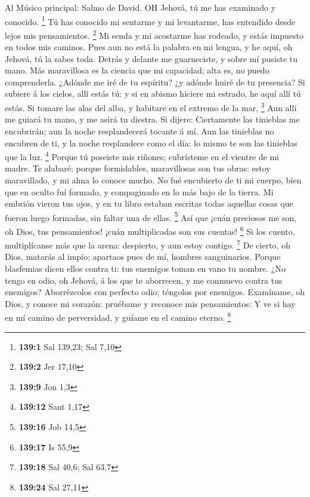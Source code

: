  Al Músico principal: Salmo de David. OH Jehová, tú me has
examinado y conocido. \footnote{\textbf{139:1} Sal 139,23; Sal 7,10}
 Tú has conocido mi sentarme y mi levantarme, has entendido
desde lejos mis pensamientos. \footnote{\textbf{139:2} Jer 17,10}
 Mi senda y mi acostarme has rodeado, y estás impuesto en
todos mis caminos.  Pues aun no está la palabra en mi
lengua, y he aquí, oh Jehová, tú la sabes toda.  Detrás y
delante me guarneciste, y sobre mí pusiste tu mano.  Más
maravillosa es la ciencia que mi capacidad; alta es, no puedo
comprenderla.  ¿Adónde me iré de tu espíritu? ¿y adónde
huiré de tu presencia?  Si subiere á los cielos, allí estás
tú: y si en abismo hiciere mi estrado, he aquí allí tú estás.
 Si tomare las alas del alba, y habitare en el extremo de la
mar, \footnote{\textbf{139:9} Jon 1,3}  Aun allí me guiará
tu mano, y me asirá tu diestra.  Si dijere: Ciertamente las
tinieblas me encubrirán; aun la noche resplandecerá tocante á mí.
 Aun las tinieblas no encubren de ti, y la noche
resplandece como el día: lo mismo te son las tinieblas que la luz.
\footnote{\textbf{139:12} Sant 1,17}  Porque tú poseiste
mis riñones; cubrísteme en el vientre de mi madre.  Te
alabaré; porque formidables, maravillosas son tus obras: estoy
maravillado, y mi alma lo conoce mucho.  No fué encubierto
de ti mi cuerpo, bien que en oculto fuí formado, y compaginado en lo más
bajo de la tierra.  Mi embrión vieron tus ojos, y en tu
libro estaban escritas todas aquellas cosas que fueron luego formadas,
sin faltar una de ellas. \footnote{\textbf{139:16} Job 14,5}
 Así que ¡cuán preciosos me son, oh Dios, tus pensamientos!
¡cuán multiplicadas son sus cuentas! \footnote{\textbf{139:17} Is 55,9}
 Si los cuento, multiplícanse más que la arena: despierto,
y aun estoy contigo. \footnote{\textbf{139:18} Sal 40,6; Sal 63,7}
 De cierto, oh Dios, matarás al impío; apartaos pues de mí,
hombres sanguinarios.  Porque blasfemias dicen ellos contra
ti: tus enemigos toman en vano tu nombre.  ¿No tengo en
odio, oh Jehová, á los que te aborrecen, y me conmuevo contra tus
enemigos?  Aborrézcolos con perfecto odio; téngolos por
enemigos.  Examíname, oh Dios, y conoce mi corazón:
pruébame y reconoce mis pensamientos:  Y ve si hay en mí
camino de perversidad, y guíame en el camino eterno. \footnote{\textbf{139:24}
  Sal 27,11}


